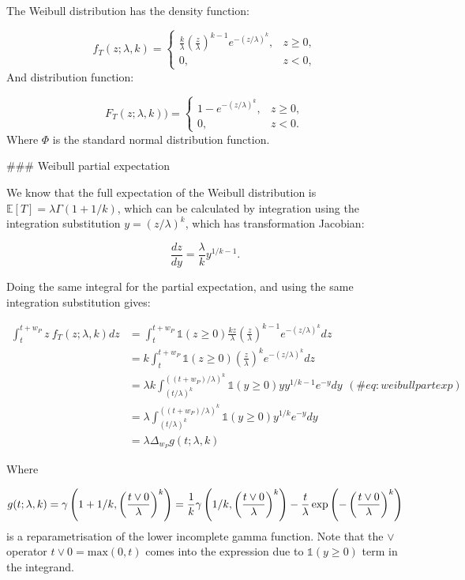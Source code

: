 \documentclass[10pt,letterpaper]{article}
\begin{document}
The Weibull distribution has the density function:

$$
f_T(z;\lambda,k) =
\begin{cases}
\frac{k}{\lambda}\left(\frac{z}{\lambda}\right)^{k-1}e^{-(z/\lambda)^{k}}, & z\geq0 ,\\
0, & z<0,
\end{cases}
$$
And distribution function:

$$
F_T(z;\lambda,k))=\begin{cases}1 - e^{-(z/\lambda)^k}, & z\geq0,\\ 0, & z<0.\end{cases}
$$
Where $\Phi$ is the standard normal distribution function.

### Weibull partial expectation

We know that the full expectation of the Weibull distribution is $\mathbb{E}[T] = \lambda \Gamma(1 + 1/k)$, which can be calculated by integration using the integration substitution $y = (z / \lambda)^k$, which has transformation Jacobian:

$$
\frac{dz}{dy} = \frac{\lambda}{k}y^{1/k - 1}.
$$

Doing the same integral for the partial expectation, and using the same integration substitution gives:

$$
\begin{aligned}
\int_{t}^{t+w_P} z~ f_T(z; \lambda,k) dz  &= \int_t^{t+w_P} \mathbb{1}(z \geq 0) \frac{kz}{\lambda}\left(\frac{z}{\lambda}\right)^{k-1}e^{-(z/\lambda)^{k}} dz \\
&= k\int_t^{t+w_P} \mathbb{1}(z \geq 0) \left(\frac{z}{\lambda}\right)^{k}e^{-(z/\lambda)^{k}} dz  \\
&= \lambda k \int_{(t / \lambda)^k}^{((t + w_P) / \lambda)^k} \mathbb{1}(y \geq 0) y y^{1/k - 1} e^{-y} dy  \\
&= \lambda\int_{(t / \lambda)^k}^{((t + w_P) / \lambda)^k} \mathbb{1}(y \geq 0)  y^{1/k} e^{-y} dy\\
&= \lambda \Delta_{w_P} g(t; \lambda,k)
\end{aligned} (\#eq:weibullpartexp)
$$

Where

$$
g(t; \lambda, k) =  \gamma\left(1 + 1/k, \left({t\vee 0 \over \lambda}\right)^k\right) =  \frac{1}{k}\gamma\left(1/k, \left({t\vee 0 \over \lambda}\right)^k\right) - \frac{t}{\lambda}\exp\left(-\left({t\vee 0 \over \lambda}\right)^k\right)
$$
is a reparametrisation of the lower incomplete gamma function. Note that the $\vee$ operator $t \vee 0 = \text{max}(0, t)$ comes into the expression due to $\mathbb{1}(y \geq 0)$ term in the integrand.
\end{document}
